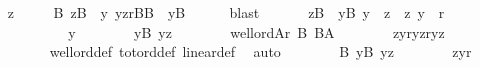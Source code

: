 \begin{isabellebody}
\ \ \isamarkupfalse%
\ z\ \isanewline
\ \ \ \ B{\isacharcolon}{\kern0pt}\ {\isachardoublequoteopen}z{\isasymin}B\ {\isasymand}\ {\isacharparenleft}{\kern0pt}{\isasymforall}y{\isachardot}{\kern0pt}\ {\isasymlangle}y{\isacharcomma}{\kern0pt}z{\isasymrangle}{\isasymin}r{\isasyminter}B{\isasymtimes}B\ {\isasymlongrightarrow}\ y{\isasymnotin}B{\isacharparenright}{\kern0pt}{\isachardoublequoteclose}\isanewline
\ \ \ \ \isamarkupfalse%
\ blast\isanewline
\ \ \isamarkupfalse%
\isanewline
\ \ \isamarkupfalse%
\ {\isachardoublequoteopen}z{\isasymin}B\ {\isasymand}\ {\isacharparenleft}{\kern0pt}{\isasymforall}y{\isasymin}B{\isachardot}{\kern0pt}\ y\ {\isasymnoteq}\ z\ {\isasymlongrightarrow}\ {\isasymlangle}z{\isacharcomma}{\kern0pt}\ y{\isasymrangle}\ {\isasymin}\ r{\isacharparenright}{\kern0pt}{\isachardoublequoteclose}\isanewline
\ \ \isamarkupfalse%
\ {\isacharminus}{\kern0pt}\isanewline
\ \ \ \ \isacommand{{\isacharbraceleft}{\kern0pt}}\isamarkupfalse%
\isanewline
\ \ \ \ \ \ \isamarkupfalse%
\ y\isanewline
\ \ \ \ \ \ \isamarkupfalse%
\ {\isachardoublequoteopen}y{\isasymin}B{\isachardoublequoteclose}\ {\isachardoublequoteopen}y{\isasymnoteq}z{\isachardoublequoteclose}\isanewline
\ \ \ \ \ \ \isamarkupfalse%
\ {\isacartoucheopen}well{\isacharunderscore}{\kern0pt}ord{\isacharparenleft}{\kern0pt}A{\isacharcomma}{\kern0pt}r{\isacharparenright}{\kern0pt}{\isacartoucheclose}\ B\ {\isacartoucheopen}B{\isasymsubseteq}A{\isacartoucheclose}\isanewline
\ \ \ \ \ \ \isamarkupfalse%
\ {\isachardoublequoteopen}{\isasymlangle}z{\isacharcomma}{\kern0pt}y{\isasymrangle}{\isasymin}r{\isacharbar}{\kern0pt}{\isasymlangle}y{\isacharcomma}{\kern0pt}z{\isasymrangle}{\isasymin}r{\isacharbar}{\kern0pt}y{\isacharequal}{\kern0pt}z{\isachardoublequoteclose}\isanewline
\ \ \ \ \ \ \ \ \isamarkupfalse%
\ well{\isacharunderscore}{\kern0pt}ord{\isacharunderscore}{\kern0pt}def\ tot{\isacharunderscore}{\kern0pt}ord{\isacharunderscore}{\kern0pt}def\ linear{\isacharunderscore}{\kern0pt}def\ \isamarkupfalse%
\ auto\isanewline
\ \ \ \ \ \ \isamarkupfalse%
\ B\ {\isacartoucheopen}y{\isasymin}B{\isacartoucheclose}\ {\isacartoucheopen}y{\isasymnoteq}z{\isacartoucheclose}\isanewline
\ \ \ \ \ \ \isamarkupfalse%
\ {\isachardoublequoteopen}{\isasymlangle}z{\isacharcomma}{\kern0pt}y{\isasymrangle}{\isasymin}r{\isachardoublequoteclose}\isanewline
\ \ \ \ \ \ \ \ \isamarkupfalse%

\end{isabellebody}
